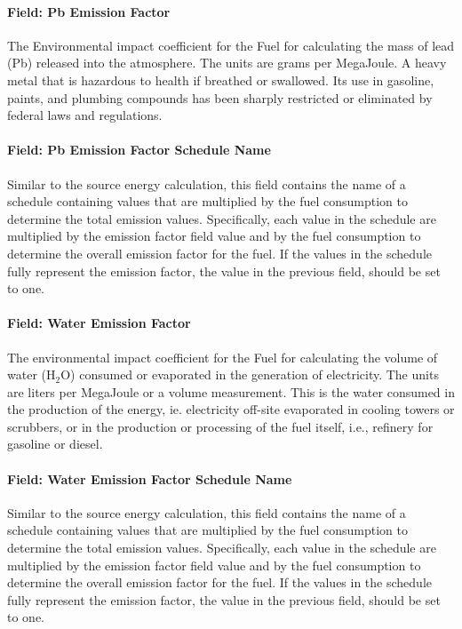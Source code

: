 \paragraph{Field: Pb Emission Factor}\label{field-pb-emission-factor}

The Environmental impact coefficient for the Fuel for calculating the mass of lead (Pb) released into the atmosphere. The units are grams per MegaJoule. A heavy metal that is hazardous to health if breathed or swallowed. Its use in gasoline, paints, and plumbing compounds has been sharply restricted or eliminated by federal laws and regulations.

\paragraph{Field: Pb Emission Factor Schedule Name}\label{field-pb-emission-factor-schedule-name}

Similar to the source energy calculation, this field contains the name of a schedule containing values that are multiplied by the fuel consumption to determine the total emission values. Specifically, each value in the schedule are multiplied by the emission factor field value and by the fuel consumption to determine the overall emission factor for the fuel. If the values in the schedule fully represent the emission factor, the value in the previous field, should be set to one.

\paragraph{Field: Water Emission Factor}\label{field-water-emission-factor}

The environmental impact coefficient for the Fuel for calculating the volume of water (H\(_{2}\)O) consumed or evaporated in the generation of electricity. The units are liters per MegaJoule or a volume measurement. This is the water consumed in the production of the energy, ie. electricity off-site evaporated in cooling towers or scrubbers, or in the production or processing of the fuel itself, i.e., refinery for gasoline or diesel.

\paragraph{Field: Water Emission Factor Schedule Name}\label{field-water-emission-factor-schedule-name}

Similar to the source energy calculation, this field contains the name of a schedule containing values that are multiplied by the fuel consumption to determine the total emission values. Specifically, each value in the schedule are multiplied by the emission factor field value and by the fuel consumption to determine the overall emission factor for the fuel. If the values in the schedule fully represent the emission factor, the value in the previous field, should be set to one.


